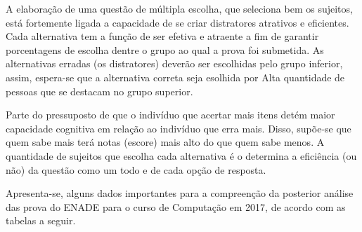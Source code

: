 \documentclass[12pt]{article}
\begin{document}
A elaboração de uma questão de múltipla escolha, que seleciona bem os sujeitos, está fortemente ligada a capacidade de se criar distratores atrativos e eficientes. Cada alternativa tem a função de ser efetiva e atraente a fim de garantir porcentagens de escolha dentre o grupo ao qual a prova foi submetida. As alternativas erradas (os distratores) deverão ser escolhidas pelo grupo inferior, assim, espera-se que a alternativa correta seja esolhida por Alta quantidade de pessoas que se destacam no grupo superior.    

Parte do pressuposto de que o indivíduo que acertar mais itens detém maior capacidade cognitiva em relação ao indivíduo que erra mais. Disso, supõe-se que quem sabe mais terá notas (escore) mais alto do que quem sabe menos. A quantidade de sujeitos que escolha cada alternativa é o determina a eficiência (ou não) da questão como um todo e de cada opção de resposta.  

Apresenta-se, alguns dados importantes para a compreenção da posterior análise das prova do ENADE para o curso de Computação em 2017, de acordo com as tabelas a seguir.
\end{document}
